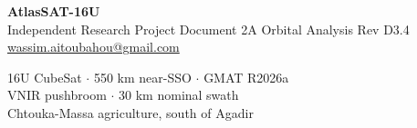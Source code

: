 \documentclass[10pt,a4paper]{article}
\begin{document}
\begin{mdframed}[backgroundcolor=atlasblue,linewidth=0pt,innertopmargin=4pt,innerbottommargin=4pt,innerleftmargin=9pt,innerrightmargin=9pt]
\begin{minipage}[c]{0.56\linewidth}
{\fontsize{16}{19}\selectfont\bfseries\color{white}AtlasSAT-16U}%
\\[1pt]
{\fontsize{7}{9}\selectfont\color{white!55!atlasblue}Independent Research Project \textbar{} Document 2A \textbar{} Orbital Analysis \textbar{} Rev D3.4 \\ \href{mailto:wassim.aitoubahou@gmail.com}{\textcolor{white!65!atlasblue}{wassim.aitoubahou@gmail.com}}}
\end{minipage}\hfill
\begin{minipage}[c]{0.40\linewidth}\raggedleft
{\fontsize{7}{9.5}\selectfont\color{white!65!atlasblue}
16U CubeSat $\cdot$ 550 km near-SSO $\cdot$ GMAT R2026a\\
VNIR pushbroom $\cdot$ 30 km nominal swath\\
Chtouka-Massa agriculture, south of Agadir}
\end{minipage}
\end{mdframed}
\end{document}
